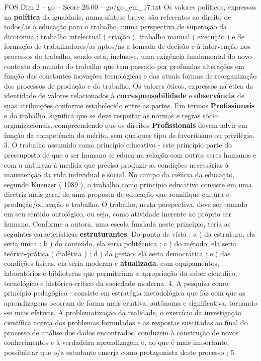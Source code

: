 \begin{textsample}{POS Dim 2 – go – Score 26.00 – go/go\_em\_17.txt}
Os valores políticos, expressos na \textbf{política} da igualdade, numa síntese breve, são referentes ao direito de todos/as à educação para o trabalho, numa perspectiva de superação da dicotomia : trabalho intelectual ( criação ), trabalho manual ( execução ) e de formação de trabalhadores/as aptos/as à tomada de decisão e à intervenção nos processos de trabalho, sendo esta, inclusive, uma exigência fundamental do novo contexto do mundo do trabalho que tem passado por profundas alterações em função das constantes inovações tecnológicas e das atuais formas de reorganização dos processos de produção e do trabalho.
Os valores éticos, expressos na ética da identidade de valores relacionados à \textbf{corresponsabilidade} e \textbf{observância} de suas atribuições conforme estabelecido entre as partes.
Em termos \textbf{Profissionais} e do trabalho, significa que se deve respeitar as normas e regras sócio organizacionais, compreendendo que os direitos \textbf{Profissionais} devem advir em função da competência do mérito, sem qualquer tipo de favoritismo ou privilégio. 3.
O trabalho assumido como princípio educativo - este princípio parte do pressuposto de que o ser humano se educa na relação com outros seres humanos e com a natureza à medida que precisa produzir as condições necessárias à manutenção da vida individual e social.
No campo da ciência da educação, segundo Kuenzer ( 1989 ), o trabalho como princípio educativo consiste em uma diretriz mais geral de uma proposta de educação que reunifique cultura e produção/educação e trabalho.
O trabalho, nesta perspectiva, deve ser tomado em seu sentido ontológico, ou seja, como atividade inerente ao próprio ser humano.
Conforme a autora, uma escola fundada neste princípio, teria as seguintes características \textbf{estruturantes}.
Do ponto de vista : a ) da estrutura, ela seria única ; b ) do conteúdo, ela seria politécnica ; c ) do método, ela seria teórico-prática ( dialética ) ; d ) da gestão, ela seria democrática ; e ) das condições físicas, ela seria moderna e \textbf{atualizada}, com equipamentos, laboratórios e bibliotecas que permitiriam a apropriação do saber científico, tecnológico e histórico-crítico da sociedade moderna. 4.
A pesquisa como princípio pedagógico - consiste em estratégia metodológica que faz com que as aprendizagens ocorram de forma mais criativa, autônoma e significativa, tornando -se mais efetivas.
A problematização da realidade, o exercício da investigação científica acerca dos problemas formulados e as respostas suscitadas ao final do processo de análise dos dados encontrados, conduzem à construção de novos conhecimentos e à verdadeira aprendizagem e, ao que é mais importante, possibilitar que o/a estudante emerja como protagonista deste processo ; 5.

\end{textsample}
